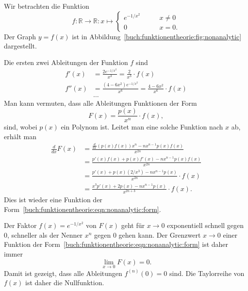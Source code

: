 \begin{beispiel}
\label{buch:funktionentheorie:beispiel:nichtanalytisch}
Wir betrachten die Funktion
\[
f\colon \mathbb{R}\to\mathbb{R}
:
x \mapsto
\begin{cases}
e^{-1/x^2}&\qquad x\ne 0\\
0&\qquad x=0.
\end{cases}
\]
Der Graph $y=f(x)$ ist in Abbildung~\ref{buch:funktionentheorie:fig:nonanalytic}
dargestellt.

Die ersten zwei Ableitungen der Funktion $f$ sind
\begin{align*}
f'(x) &= \frac{2e^{-1/x^2}}{x^3} = \frac{2}{x^3}\cdot f(x)
\\
f''(x) &= \frac{(4-6x^2) e^{-1/x^2}}{x^6} = \frac{4-6x^2}{x^6}\cdot f(x)
\\
&\dots
\end{align*}
Man kann vermuten, dass alle
Ableitungen Funktionen der Form
\begin{equation}
F(x) = \frac{p(x)}{x^n} \cdot f(x),
\label{buch:funktionentheorie:eqn:nonanalytic:form}
\end{equation}
sind,
wobei $p(x)$ ein Polynom ist.
Leitet man eine solche Funktion nach $x$ ab, erhält man
\begin{align*}
\frac{d}{dx} F(x)
&=
\frac{\frac{d}{dx}(p(x)f(x)) x^n - nx^{n-1}p(x)f(x)}{x^{2n}}
\\
&=
\frac{p'(x)f(x) + p(x)f'(x) - nx^{n-1}p(x)f(x)}{x^{2n}} 
\\
&=
\frac{p'(x) + p(x)(2/x^3) - nx^{n-1}p(x)}{x^{2n}} \cdot f(x)
\\
&=
\frac{x^3p'(x)+2p(x)-nx^{n-1}p(x)}{x^{2n+3}}\cdot f(x).
\end{align*}
Dies ist wieder eine Funktion der
Form~\eqref{buch:funktionentheorie:eqn:nonanalytic:form}.

Der Faktor $f(x)=e^{-1/x^2}$ von $F(x)$ geht für $x\to 0$ exponentiell
schnell gegen $0$, schneller als der Nenner $x^n$ gegen $0$ gehen
kann. 
Der Grenzwert $x\to 0$ einer Funktion der 
Form~\eqref{buch:funktionentheorie:eqn:nonanalytic:form}
ist daher immer
\[
\lim_{x\to 0}  F(x) =0.
\]
Damit ist gezeigt, dass alle Ableitungen $f^{(n)}(0)=0$ sind.
Die Taylorreihe von $f(x)$ ist daher die Nullfunktion.
\end{beispiel}

%


